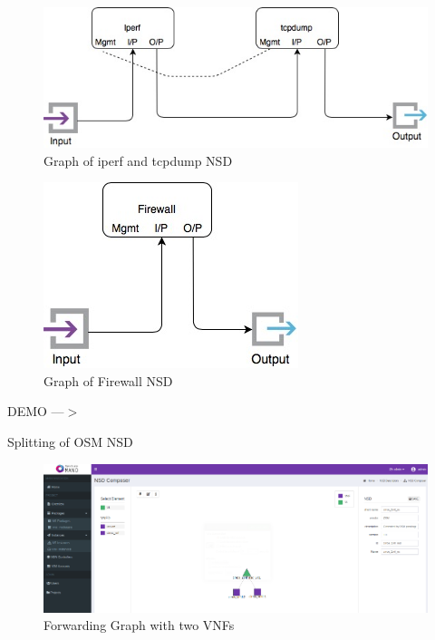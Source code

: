\begin{frame}
\begin{figure} 
	\centering
	\includegraphics[width=0.6\linewidth]{images/img-4-split}
	\caption{Graph of iperf and tcpdump NSD}
\end{figure}


\begin{figure}
	\centering
	\includegraphics[width=0.3\linewidth]{images/img-5-split}
	\caption{Graph of Firewall NSD}
\end{figure}
\end{frame}

\begin{frame}

\Huge{\centerline{DEMO ---$ > $}}

\end{frame}

\begin{frame}
\Huge{\centerline{Splitting of OSM NSD}}
\end{frame}

\begin{frame}
\begin{figure}
	\centering
	\includegraphics[width=1\linewidth]{images/mainFG}
	\caption{Forwarding Graph with two VNFs}
	\label{fig:mainfg}
\end{figure}
\end{frame}

